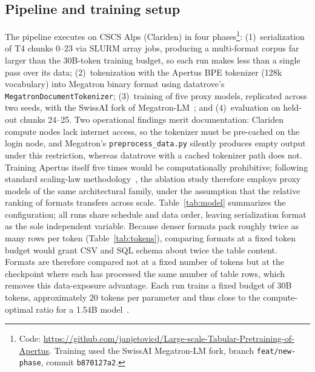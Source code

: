 \documentclass[11pt,a4paper]{article}
\begin{document}
\subsection{Pipeline and training setup}
The pipeline executes on CSCS Alps (Clariden) in four phases\footnote{Code: \url{https://github.com/janjetovicd/Large-scale-Tabular-Pretraining-of-Apertus}. Training used the SwissAI Megatron-LM fork, branch \texttt{feat/new-phase}, commit \texttt{b870127a2}.}: (1)~serialization of T4 chunks 0--23 via SLURM array jobs, producing a multi-format corpus far larger than the 30B-token training budget, so each run makes less than a single pass over its data; (2)~tokenization with the Apertus BPE tokenizer (128k vocabulary) into Megatron binary format using datatrove's \texttt{MegatronDocumentTokenizer}; (3)~training of five proxy models, replicated across two seeds, with the SwissAI fork of Megatron-LM~\cite{megatron}; and (4)~evaluation on held-out chunks 24--25. Two operational findings merit documentation: Clariden compute nodes lack internet access, so the tokenizer must be pre-cached on the login node, and Megatron's \texttt{preprocess\_data.py} silently produces empty output under this restriction, whereas datatrove with a cached tokenizer path does not.
Training Apertus itself five times would be computationally prohibitive; following standard scaling-law methodology~\cite{chinchilla}, the ablation study therefore employs proxy models of the same architectural family, under the assumption that the relative ranking of formats transfers across scale. Table~\ref{tab:model} summarizes the configuration; all runs share schedule and data order, leaving serialization format as the sole independent variable. Because denser formats pack roughly twice as many rows per token (Table~\ref{tab:tokens}), comparing formats at a fixed token budget would grant CSV and SQL schema about twice the table content. Formats are therefore compared not at a fixed number of tokens but at the checkpoint where each has processed the same number of table rows, which removes this data-exposure advantage. Each run trains a fixed budget of 30B tokens, approximately 20 tokens per parameter and thus close to the compute-optimal ratio for a 1.54B model~\cite{chinchilla}.
\end{document}
